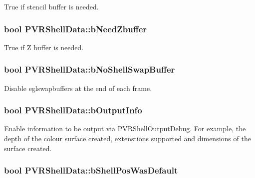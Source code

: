 True if stencil buffer is needed. \hypertarget{struct_p_v_r_shell_data_a89301344798402c755de76d18db45f64}{
\subsubsection[{b\+Need\+Zbuffer}]{\setlength{\rightskip}{0pt plus 5cm}bool P\+V\+R\+Shell\+Data\+::b\+Need\+Zbuffer}}\label{struct_p_v_r_shell_data_a89301344798402c755de76d18db45f64}
True if Z buffer is needed. \hypertarget{struct_p_v_r_shell_data_a7b5110e4d5f7b25326f2513348f5a644}{
\subsubsection[{b\+No\+Shell\+Swap\+Buffer}]{\setlength{\rightskip}{0pt plus 5cm}bool P\+V\+R\+Shell\+Data\+::b\+No\+Shell\+Swap\+Buffer}}\label{struct_p_v_r_shell_data_a7b5110e4d5f7b25326f2513348f5a644}
Disable eglswapbuffers at the end of each frame. \hypertarget{struct_p_v_r_shell_data_a4c2223efb52a1872dc001f2847c5bc30}{
\subsubsection[{b\+Output\+Info}]{\setlength{\rightskip}{0pt plus 5cm}bool P\+V\+R\+Shell\+Data\+::b\+Output\+Info}}\label{struct_p_v_r_shell_data_a4c2223efb52a1872dc001f2847c5bc30}
Enable information to be output via P\+V\+R\+Shell\+Output\+Debug. For example, the depth of the colour surface created, extenstions supported and dimensions of the surface created. \hypertarget{struct_p_v_r_shell_data_aeeb549968c28f17dc93cd2fd6007cf63}{
\subsubsection[{b\+Shell\+Pos\+Was\+Default}]{\setlength{\rightskip}{0pt plus 5cm}bool P\+V\+R\+Shell\+Data\+::b\+Shell\+Pos\+Was\+Default}}\label{struct_p_v_r_shell_data_aeeb549968c28f17dc93cd2fd6007cf63}
